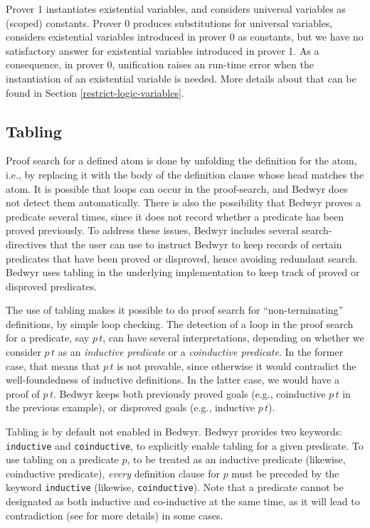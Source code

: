 \documentclass{article}
\begin{document}
Prover 1 instantiates existential variables, and considers universal variables 
as (scoped) constants. Prover 0 produces substitutions for universal variables,
considers existential variables introduced in prover 0 as constants,
but we have no satisfactory answer for existential variables introduced in 
prover 1.
As a consequence, in prover 0, unification raises an run-time error
when the instantiation of an existential variable is needed.
More details about that can be found in Section \ref{restrict-logic-variables}.

\subsection{Tabling}

Proof search for a defined atom is done by unfolding the definition 
for the atom, i.e., by replacing it with the body of the definition clause 
whose head matches the atom. It is possible that loops can occur in 
the proof-search, and Bedwyr does not detect them automatically. 
There is also the possibility that Bedwyr proves a predicate several
times, since it does not record whether a predicate has been proved
previously.
To address these issues, Bedwyr includes several search-directives
that the user can use to instruct Bedwyr to keep records of certain
predicates that have been proved or disproved, hence avoiding redundant search.
Bedwyr uses tabling in the underlying implementation to keep track
of proved or disproved predicates.

The use of tabling makes it possible to do proof search for
``non-terminating'' definitions, by simple loop checking.
The detection of a loop in the proof search for a predicate, say
$p\,t$, can have several interpretations, depending on whether
we consider $p\,t$ as an {\em inductive predicate} or
a {\em coinductive predicate}. In the former case, that means that
$p\,t$ is not provable, since otherwise it would contradict
the well-foundedness of inductive definitions. In the latter case,
we would have a proof of $p\,t$. Bedwyr keeps both previously proved goals 
(e.g., coinductive $p\,t$ in the previous example), 
or disproved goals (e.g., inductive $p\,t$). 

Tabling is by default not enabled in Bedwyr. Bedwyr provides two
keywords: \texttt{inductive} and \texttt{coinductive}, to explicitly
enable tabling for a given predicate. 
To use tabling on a predicate $p$, to be treated as an inductive predicate
(likewise, coinductive predicate), {\em every} definition clause for $p$
must be preceded by the keyword \texttt{inductive} 
(likewise, \texttt{coinductive}).
Note that a predicate cannot be designated as both inductive and co-inductive
at the same time, as it will lead to contradiction (see 
\cite{momigliano03types} for more details) in some cases. 
\end{document}
